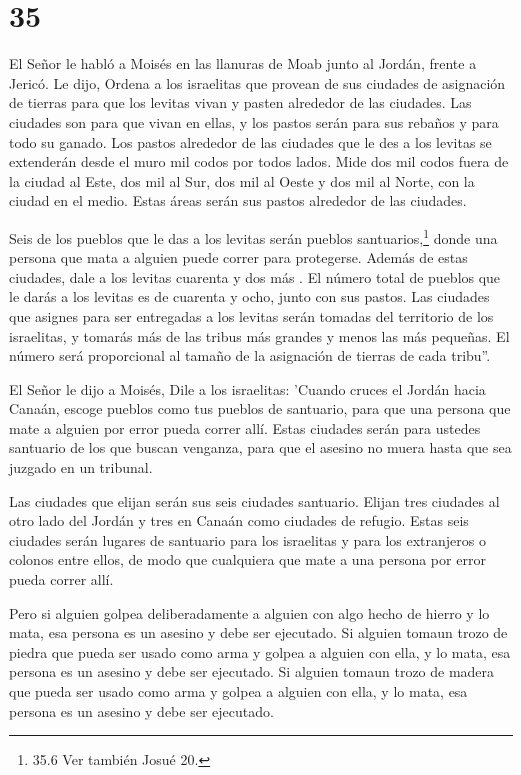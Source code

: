 \hypertarget{section-34}{%
\section{35}\label{section-34}}

 El Señor le habló a Moisés en las llanuras de Moab junto al
Jordán, frente a Jericó. Le dijo,  Ordena a los israelitas
que provean de sus ciudades de asignación de tierras para que los
levitas vivan y pasten alrededor de las ciudades.  Las
ciudades son para que vivan en ellas, y los pastos serán para sus
rebaños y para todo su ganado.  Los pastos alrededor de las
ciudades que le des a los levitas se extenderán desde el muro mil codos
por todos lados.  Mide dos mil codos fuera de la ciudad al
Este, dos mil al Sur, dos mil al Oeste y dos mil al Norte, con la ciudad
en el medio. Estas áreas serán sus pastos alrededor de las ciudades.

 Seis de los pueblos que le das a los levitas serán pueblos
santuarios,\footnote{35.6 Ver también Josué 20.} donde una persona que
mata a alguien puede correr para protegerse. Además de estas ciudades,
dale a los levitas cuarenta y dos más .  El número total de
pueblos que le darás a los levitas es de cuarenta y ocho, junto con sus
pastos.  Las ciudades que asignes para ser entregadas a los
levitas serán tomadas del territorio de los israelitas, y tomarás más de
las tribus más grandes y menos las más pequeñas. El número será
proporcional al tamaño de la asignación de tierras de cada tribu''.

 El Señor le dijo a Moisés,  Dile a los
israelitas: 'Cuando cruces el Jordán hacia Canaán,  escoge
pueblos como tus pueblos de santuario, para que una persona que mate a
alguien por error pueda correr allí.  Estas ciudades serán
para ustedes santuario de los que buscan venganza, para que el asesino
no muera hasta que sea juzgado en un tribunal.

 Las ciudades que elijan serán sus seis ciudades santuario.
 Elijan tres ciudades al otro lado del Jordán y tres en
Canaán como ciudades de refugio.  Estas seis ciudades serán
lugares de santuario para los israelitas y para los extranjeros o
colonos entre ellos, de modo que cualquiera que mate a una persona por
error pueda correr allí.

 Pero si alguien golpea deliberadamente a alguien con algo
hecho de hierro y lo mata, esa persona es un asesino y debe ser
ejecutado.  Si alguien tomaun trozo de piedra que pueda ser
usado como arma y golpea a alguien con ella, y lo mata, esa persona es
un asesino y debe ser ejecutado.  Si alguien tomaun trozo
de madera que pueda ser usado como arma y golpea a alguien con ella, y
lo mata, esa persona es un asesino y debe ser ejecutado.


